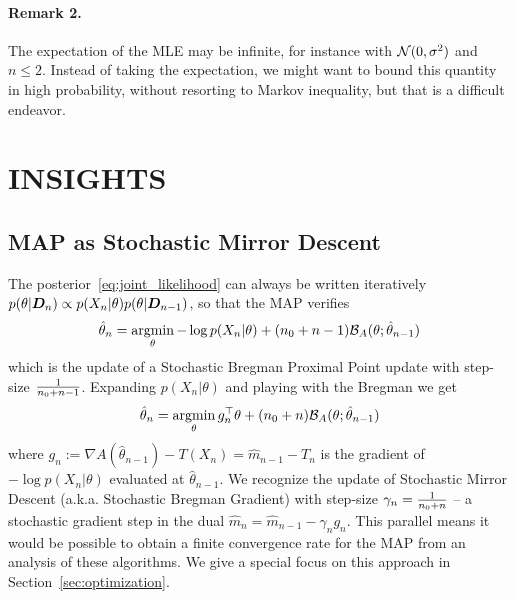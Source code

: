 \documentclass[twoside]{article}
\let\oldsection\section
\renewcommand{\section}[1]{\oldsection{\texorpdfstring{\uppercase{#1}}{#1}}}
\newcommand{\logpart}{A}
\newcommand{\bregman}{\cB_\logpart}
\newcommand{\nat}{\theta}
\newcommand{\m}{m}
\newcommand{\lr}{\gamma} %
\begin{document}
\paragraph{Remark 2.}
The expectation of the MLE may be infinite, for instance with ${\mathcal N}(0,\sigma^2)$ and $n\leq 2$. Instead of taking the expectation,  we might want to bound this quantity in high probability, without resorting to Markov inequality, but that is a difficult endeavor.

\section{Insights}

\subsection{MAP as Stochastic Mirror Descent}
\label{ssec:MAP=SMD}
The posterior~\eqref{eq:joint_likelihood} can always be written iteratively $p(\nat | \mD_n) \propto p(X_n | \nat) p(\nat | \mD_{n-1})$, so that the MAP verifies
\begin{align*}
	\hat \nat_{n}
	= \argmin_\nat - \log p(X_{n} | \nat) + (n_0 + n -1) \bregman(\nat; \hat \nat_{n-1})
\end{align*}
which is the update of a Stochastic Bregman Proximal Point update with step-size $\frac{1}{n_0 + n - 1}$. Expanding $p(X_{n} | \nat)$ and  playing with the Bregman we get
\begin{align}
		\hat \nat_{n}
	= \argmin_\nat g_{n}^\top \nat + (n_0 + n) \bregman(\nat; \hat \nat_{n-1})
    \label{eq:SMD}
\end{align}
where $g_{n} := \nabla\logpart(\hat \nat_{n-1}) - T(X_n) = \hat \m_{n-1} - T_n$ is the gradient of $-\log p(X_{n} | \nat)$ evaluated at $\hat \nat_{n-1}$. 
We recognize the update of Stochastic Mirror Descent (a.k.a. Stochastic Bregman Gradient) with step-size $\lr_n = \inv{n_0 + n}$ -- a stochastic gradient step in the dual $\hat \m_n = \hat \m_{n-1} - \lr_n g_n$.
This parallel means it would be possible to obtain a finite convergence rate for the  MAP from an analysis of these algorithms. 
We give a special focus on this approach in Section~\ref{sec:optimization}.
\end{document}
